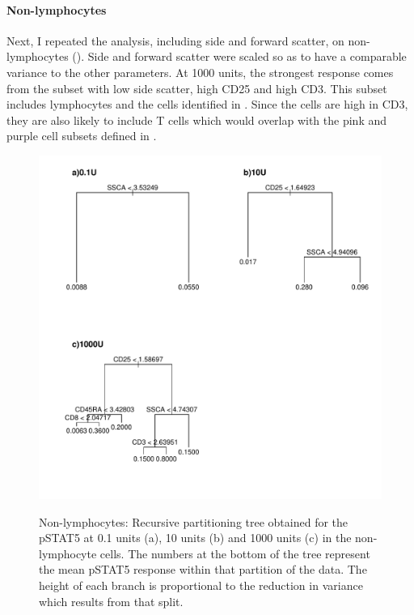 \paragraph{Non-lymphocytes}

Next, I repeated the analysis, including side and forward scatter, on non-lymphocytes ().
Side and forward scatter were scaled so as to have a comparable variance to the other parameters.
At 1000 units, the strongest response comes from the subset with low side scatter, high CD25 and high CD3.
This subset includes lymphocytes and the cells identified in .
Since the cells are high in CD3, they are also likely to include T cells which would overlap with the pink and purple cell subsets
defined in .

%
\begin{figure}[!h]
\centering
\begin{minipage}{.6\textwidth}
\includegraphics[width=\linewidth]{figures/cart-nonlymphocytes-trees-pstat5}
\end{minipage}
\begin{minipage}{.35\textwidth}
{ Non-lymphocytes: Recursive partitioning tree obtained for the pSTAT5 at 0.1 units (a), 10 units (b) and 1000 units (c) in the non-lymphocyte cells.  }
{
  The numbers at the bottom of the tree represent the mean pSTAT5 response within that partition of the data.
  The height of each branch is proportional to the reduction in variance which results from that split.
}
\end{minipage}
\end{figure}


